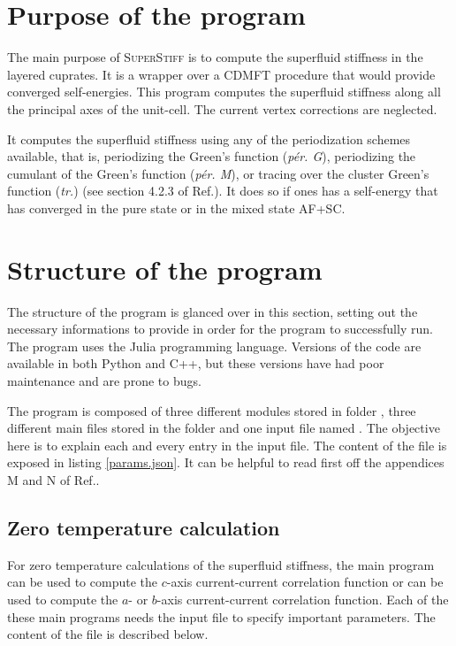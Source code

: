 \documentclass{article}
\begin{document}
\section{Purpose of the program}
\label{sec:Purpose}

The main purpose of \textsc{SuperStiff} is to compute the superfluid stiffness in the layered cuprates. It is a wrapper over a CDMFT procedure that would provide converged self-energies. This program computes the superfluid stiffness along all the principal axes of the unit-cell. The current vertex corrections are neglected. 

It computes the superfluid stiffness using any of the periodization schemes available, that is, periodizing the Green's function (\textit{pér. G}), periodizing the cumulant of the Green's function (\textit{pér. M}), or tracing over the cluster Green's function (\textit{tr.}) (see section 4.2.3 of Ref.\cite{simard_master}). It does so if ones has a self-energy that has converged in the pure state or in the mixed state AF+SC.

\section{Structure of the program}
\label{sec:structure_of_program}

The structure of the program is glanced over in this section, setting out the necessary informations to provide in order for the program to successfully run. The program uses the Julia programming language. Versions of the code are available in both Python and C++, but these versions have had poor maintenance and are prone to bugs.

The program is composed of three different modules stored in folder , three different main files stored in the folder  and one input file named . The objective here is to explain each and every entry in the input file. The content of the  file is exposed in listing \ref{params.json}. It can be helpful to read first off the appendices M and N of Ref.\cite{simard_master}.

\clearpage

\subsection{Zero temperature calculation}
\label{zero_T_calculation}

For zero temperature calculations of the superfluid stiffness, the main program  can be used to compute the $c$-axis current-current correlation function or  can be used to compute the $a$- or $b$-axis current-current correlation function. Each of the these main programs needs the input file  to specify important parameters. The content of the  file is described below.
\end{document}
